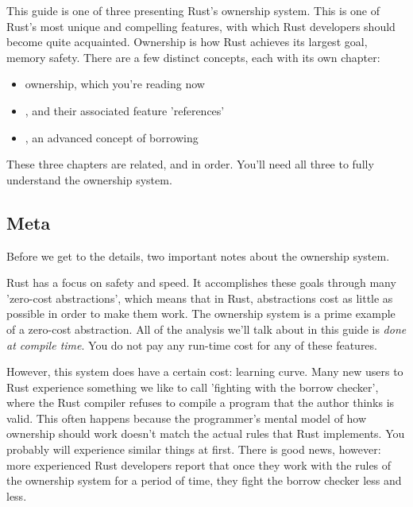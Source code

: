 This guide is one of three presenting Rust's ownership system. This is one of Rust's most unique and compelling features, with 
which Rust developers should become quite acquainted. Ownership is how Rust achieves its largest goal, memory safety. There are 
a few distinct concepts, each with its own chapter:

\begin{itemize}
  \item{ownership, which you're reading now}
  \item{, and their associated feature 'references'}
  \item{, an advanced concept of borrowing}
\end{itemize}

These three chapters are related, and in order. You'll need all three to fully understand the ownership system.

\subsection*{Meta}

Before we get to the details, two important notes about the ownership system.

\blank

Rust has a focus on safety and speed. It accomplishes these goals through many 'zero-cost abstractions', which means that in 
Rust, abstractions cost as little as possible in order to make them work. The ownership system is a prime example of a zero-cost
abstraction. All of the analysis we'll talk about in this guide is \emph{done at compile time}. You do not pay any run-time cost 
for any of these features.

\blank

However, this system does have a certain cost: learning curve. Many new users to Rust experience something we like to call 
'fighting with the borrow checker', where the Rust compiler refuses to compile a program that the author thinks is valid. 
This often happens because the programmer's mental model of how ownership should work doesn't match the actual rules that Rust 
implements. You probably will experience similar things at first. There is good news, however: more experienced Rust developers 
report that once they work with the rules of the ownership system for a period of time, they fight the borrow checker less and less.

\blank

